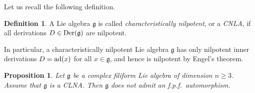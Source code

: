 \documentclass[12pt]{amsart}
\newtheorem{prop}[thm]{Proposition}
\theoremstyle{definition}
\newtheorem{defi}[thm]{Definition}
\theoremstyle{remark}
\newcommand{\ad}{{\rm ad}}
\newcommand{\Der}{{\rm Der}}
\newcommand{\Lg}{\mathfrak{g}}
\begin{document}
Let us recall the following definition.

\begin{defi}
A Lie algebra $\Lg$ is called {\em characteristically nilpotent}, or a {\em CNLA}, if all derivations
$D\in \Der(\Lg)$ are nilpotent.
\end{defi}

In particular, a characteristically nilpotent Lie algebra $\Lg$ has only nilpotent inner derivations
$D=\ad(x)$ for all $x\in \Lg$, and hence is nilpotent by Engel's theorem.

\begin{prop}\label{6.4}
Let $\Lg$ be a complex filiform Lie algebra of dimension $n\ge 3$. Assume that $\Lg$ is a CLNA. Then $\Lg$ does
not admit an f.p.f.\ automorphism.
\end{prop}  
\end{document}
